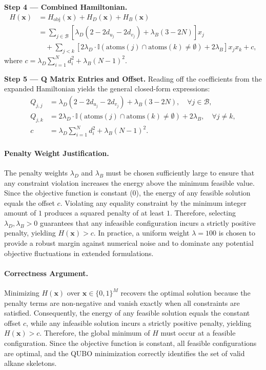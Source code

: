 \documentclass[12pt]{article}
\begin{document}
\textbf{Step 4 --- Combined Hamiltonian.}
\begin{align}
H(\mathbf{x}) &= H_{\text{obj}}(\mathbf{x}) + H_D(\mathbf{x}) + H_B(\mathbf{x}) \nonumber \\
&= \sum_{j \in \mathcal{B}} \left[ \lambda_D (2 - 2d_{u_j} - 2d_{v_j}) + \lambda_B (3 - 2N) \right] x_j \nonumber \\
&\quad + \sum_{j < k} \left[ 2\lambda_D \cdot \mathbb{I}(\text{atoms}(j) \cap \text{atoms}(k) \neq \emptyset) + 2\lambda_B \right] x_j x_k + c,
\end{align}
where $c = \lambda_D \sum_{i=1}^N d_i^2 + \lambda_B (N-1)^2$.

\textbf{Step 5 --- Q Matrix Entries and Offset.}
Reading off the coefficients from the expanded Hamiltonian yields the general closed-form expressions:
\begin{align}
Q_{j,j} &= \lambda_D (2 - 2d_{u_j} - 2d_{v_j}) + \lambda_B (3 - 2N), \quad \forall j \in \mathcal{B}, \\
Q_{j,k} &= 2\lambda_D \cdot \mathbb{I}(\text{atoms}(j) \cap \text{atoms}(k) \neq \emptyset) + 2\lambda_B, \quad \forall j \neq k, \\
c &= \lambda_D \sum_{i=1}^N d_i^2 + \lambda_B (N-1)^2.
\end{align}

\paragraph{Penalty Weight Justification.}
The penalty weights $\lambda_D$ and $\lambda_B$ must be chosen sufficiently large to ensure that any constraint violation increases the energy above the minimum feasible value. Since the objective function is constant ($0$), the energy of any feasible solution equals the offset $c$. Violating any equality constraint by the minimum integer amount of $1$ produces a squared penalty of at least $1$. Therefore, selecting $\lambda_D, \lambda_B > 0$ guarantees that any infeasible configuration incurs a strictly positive penalty, yielding $H(\mathbf{x}) > c$. In practice, a uniform weight $\lambda = 100$ is chosen to provide a robust margin against numerical noise and to dominate any potential objective fluctuations in extended formulations.

\paragraph{Correctness Argument.}
Minimizing $H(\mathbf{x})$ over $\mathbf{x} \in \{0,1\}^M$ recovers the optimal solution because the penalty terms are non-negative and vanish exactly when all constraints are satisfied. Consequently, the energy of any feasible solution equals the constant offset $c$, while any infeasible solution incurs a strictly positive penalty, yielding $H(\mathbf{x}) > c$. Therefore, the global minimum of $H$ must occur at a feasible configuration. Since the objective function is constant, all feasible configurations are optimal, and the QUBO minimization correctly identifies the set of valid alkane skeletons.
\end{document}
